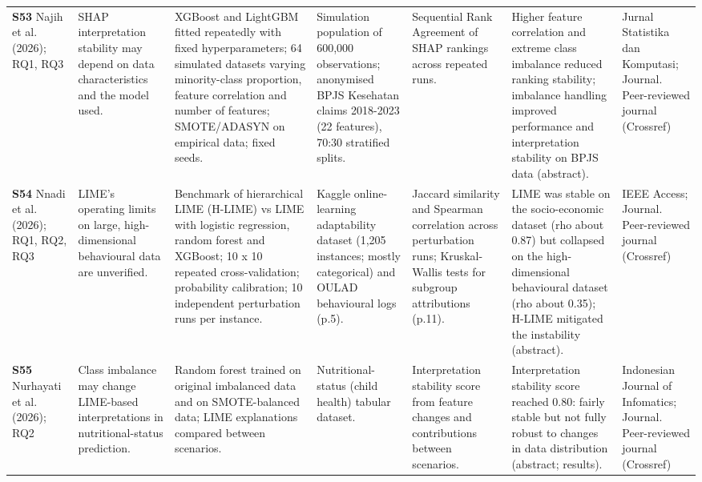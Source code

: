 \begin{longtable}{@{}P{1.55cm}P{2.9cm}P{4.5cm}P{3.2cm}P{3.4cm}P{4.6cm}P{3.6cm}@{}}
\textbf{S53} \cite{S53} Najih et al. (2026); RQ1, RQ3 & SHAP interpretation stability may depend on data characteristics and the model used. & XGBoost and LightGBM fitted repeatedly with fixed hyperparameters; 64 simulated datasets varying minority-class proportion, feature correlation and number of features; SMOTE/\allowbreak{}ADASYN on empirical data; fixed seeds. & Simulation population of 600,000 observations; anonymised BPJS Kesehatan claims 2018-2023 (22 features), 70:30 stratified splits. & Sequential Rank Agreement of SHAP rankings across repeated runs. & Higher feature correlation and extreme class imbalance reduced ranking stability; imbalance handling improved performance and interpretation stability on BPJS data (abstract). & Jurnal Statistika dan Komputasi; Journal. Peer-reviewed journal (Crossref) \\
\textbf{S54} \cite{S54} Nnadi et al. (2026); RQ1, RQ2, RQ3 & LIME's operating limits on large, high-dimensional behavioural data are unverified. & Benchmark of hierarchical LIME (H-LIME) vs LIME with logistic regression, random forest and XGBoost; 10 x 10 repeated cross-validation; probability calibration; 10 independent perturbation runs per instance. & Kaggle online-learning adaptability dataset (1,205 instances; mostly categorical) and OULAD behavioural logs (p.5). & Jaccard similarity and Spearman correlation across perturbation runs; Kruskal-Wallis tests for subgroup attributions (p.11). & LIME was stable on the socio-economic dataset (rho about 0.87) but collapsed on the high-dimensional behavioural dataset (rho about 0.35); H-LIME mitigated the instability (abstract). & IEEE Access; Journal. Peer-reviewed journal (Crossref) \\
\textbf{S55} \cite{S55} Nurhayati et al. (2026); RQ2 & Class imbalance may change LIME-based interpretations in nutritional-status prediction. & Random forest trained on original imbalanced data and on SMOTE-balanced data; LIME explanations compared between scenarios. & Nutritional-status (child health) tabular dataset. & Interpretation stability score from feature changes and contributions between scenarios. & Interpretation stability score reached 0.80: fairly stable but not fully robust to changes in data distribution (abstract; results). & Indonesian Journal of Infomatics; Journal. Peer-reviewed journal (Crossref) \\

\end{longtable}
